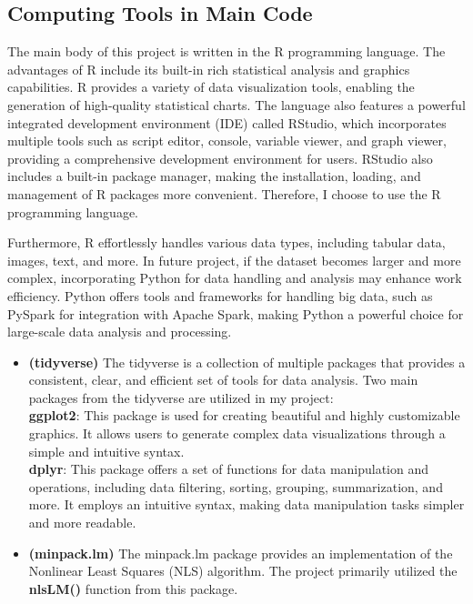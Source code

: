 \documentclass[11pt]{article}
\begin{document}
\subsection{Computing Tools in Main Code}
The main body of this project is written in the R programming language. The advantages of R include its built-in rich statistical analysis and graphics capabilities. R provides a variety of data visualization tools, enabling the generation of high-quality statistical charts. The language also features a powerful integrated development environment (IDE) called RStudio, which incorporates multiple tools such as script editor, console, variable viewer, and graph viewer, providing a comprehensive development environment for users. RStudio also includes a built-in package manager, making the installation, loading, and management of R packages more convenient. Therefore, I choose to use the R programming language.\par
Furthermore, R effortlessly handles various data types, including tabular data, images, text, and more. In future project, if the dataset becomes larger and more complex, incorporating Python for data handling and analysis may enhance work efficiency. Python offers tools and frameworks for handling big data, such as PySpark for integration with Apache Spark, making Python a powerful choice for large-scale data analysis and processing.
\begin{itemize}
    \item \textbf{(tidyverse)} The tidyverse is a collection of multiple packages that provides a consistent, clear, and efficient set of tools for data analysis. Two main packages from the tidyverse are utilized in my project:\\
    \textbf{ggplot2}: This package is used for creating beautiful and highly customizable graphics. It allows users to generate complex data visualizations through a simple and intuitive syntax.\\
    \textbf{dplyr}: This package offers a set of functions for data manipulation and operations, including data filtering, sorting, grouping, summarization, and more. It employs an intuitive syntax, making data manipulation tasks simpler and more readable.
    \item \textbf{(minpack.lm)} The minpack.lm package provides an implementation of the Nonlinear Least Squares (NLS) algorithm. The project primarily utilized the \textbf{nlsLM()} function from this package.
\end{itemize}
\end{document}
